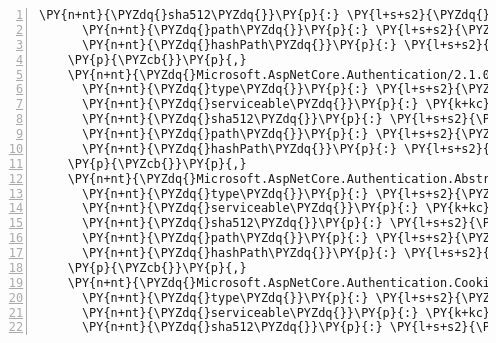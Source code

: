 \begin{Verbatim}[commandchars=\\\{\},numbers=left,firstnumber=1,stepnumber=1,numberblanklines=0]
      \PY{n+nt}{\PYZdq{}sha512\PYZdq{}}\PY{p}{:} \PY{l+s+s2}{\PYZdq{}sha512\PYZhy{}vpOaIfZg076bh9eZ4IjwJZlwVmS0qgrGepbS1BLLQ+VvkYA1oAm/ujmxaf9zsw/FkV4iyqNMQ9omzVzBaww+Ew==\PYZdq{}}\PY{p}{,}
      \PY{n+nt}{\PYZdq{}path\PYZdq{}}\PY{p}{:} \PY{l+s+s2}{\PYZdq{}microsoft.aspnetcore.app/2.1.0\PYZhy{}rc1\PYZhy{}final\PYZdq{}}\PY{p}{,}
      \PY{n+nt}{\PYZdq{}hashPath\PYZdq{}}\PY{p}{:} \PY{l+s+s2}{\PYZdq{}microsoft.aspnetcore.app.2.1.0\PYZhy{}rc1\PYZhy{}final.nupkg.sha512\PYZdq{}}
    \PY{p}{\PYZcb{}}\PY{p}{,}
    \PY{n+nt}{\PYZdq{}Microsoft.AspNetCore.Authentication/2.1.0\PYZhy{}rc1\PYZhy{}final\PYZdq{}}\PY{p}{:} \PY{p}{\PYZob{}}
      \PY{n+nt}{\PYZdq{}type\PYZdq{}}\PY{p}{:} \PY{l+s+s2}{\PYZdq{}package\PYZdq{}}\PY{p}{,}
      \PY{n+nt}{\PYZdq{}serviceable\PYZdq{}}\PY{p}{:} \PY{k+kc}{true}\PY{p}{,}
      \PY{n+nt}{\PYZdq{}sha512\PYZdq{}}\PY{p}{:} \PY{l+s+s2}{\PYZdq{}sha512\PYZhy{}1uvLf7M/aI5pKexyeuQqmKPbN1DLeA/aDFWJv2Od2Pt8Gc+Q1wAYrX9ia471E/H6BsGE1eoGn+eMxjQkb0UaOQ==\PYZdq{}}\PY{p}{,}
      \PY{n+nt}{\PYZdq{}path\PYZdq{}}\PY{p}{:} \PY{l+s+s2}{\PYZdq{}microsoft.aspnetcore.authentication/2.1.0\PYZhy{}rc1\PYZhy{}final\PYZdq{}}\PY{p}{,}
      \PY{n+nt}{\PYZdq{}hashPath\PYZdq{}}\PY{p}{:} \PY{l+s+s2}{\PYZdq{}microsoft.aspnetcore.authentication.2.1.0\PYZhy{}rc1\PYZhy{}final.nupkg.sha512\PYZdq{}}
    \PY{p}{\PYZcb{}}\PY{p}{,}
    \PY{n+nt}{\PYZdq{}Microsoft.AspNetCore.Authentication.Abstractions/2.1.0\PYZhy{}rc1\PYZhy{}final\PYZdq{}}\PY{p}{:} \PY{p}{\PYZob{}}
      \PY{n+nt}{\PYZdq{}type\PYZdq{}}\PY{p}{:} \PY{l+s+s2}{\PYZdq{}package\PYZdq{}}\PY{p}{,}
      \PY{n+nt}{\PYZdq{}serviceable\PYZdq{}}\PY{p}{:} \PY{k+kc}{true}\PY{p}{,}
      \PY{n+nt}{\PYZdq{}sha512\PYZdq{}}\PY{p}{:} \PY{l+s+s2}{\PYZdq{}sha512\PYZhy{}jMosD2lrPppEQehjZwCKXfx6Ie5EWW/l+nI8DlaoOHa2/DaNnUBLGVgd1fDngrE9Dqj+Od64WRgwquJaQq0YOw==\PYZdq{}}\PY{p}{,}
      \PY{n+nt}{\PYZdq{}path\PYZdq{}}\PY{p}{:} \PY{l+s+s2}{\PYZdq{}microsoft.aspnetcore.authentication.abstractions/2.1.0\PYZhy{}rc1\PYZhy{}final\PYZdq{}}\PY{p}{,}
      \PY{n+nt}{\PYZdq{}hashPath\PYZdq{}}\PY{p}{:} \PY{l+s+s2}{\PYZdq{}microsoft.aspnetcore.authentication.abstractions.2.1.0\PYZhy{}rc1\PYZhy{}final.nupkg.sha512\PYZdq{}}
    \PY{p}{\PYZcb{}}\PY{p}{,}
    \PY{n+nt}{\PYZdq{}Microsoft.AspNetCore.Authentication.Cookies/2.1.0\PYZhy{}rc1\PYZhy{}final\PYZdq{}}\PY{p}{:} \PY{p}{\PYZob{}}
      \PY{n+nt}{\PYZdq{}type\PYZdq{}}\PY{p}{:} \PY{l+s+s2}{\PYZdq{}package\PYZdq{}}\PY{p}{,}
      \PY{n+nt}{\PYZdq{}serviceable\PYZdq{}}\PY{p}{:} \PY{k+kc}{true}\PY{p}{,}
      \PY{n+nt}{\PYZdq{}sha512\PYZdq{}}\PY{p}{:} \PY{l+s+s2}{\PYZdq{}sha512\PYZhy{}JithEj76c+/zMP3GWLlWmO872qn3YLQbfph+oFQks5JYPLZ6Byly0yuKi/sfLmli5DJA+iiux63BSGIcjgt7cA==\PYZdq{}}\PY{p}{,}

\end{Verbatim}
